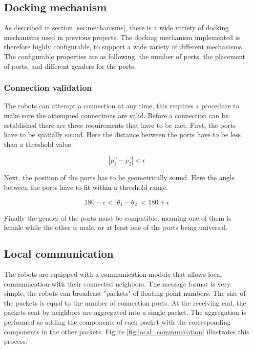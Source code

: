 	 
	\subsection{Docking mechanism}
	As described in section \ref{sec:mechanisms}, there is a wide variety of docking mechanisms used in previous projects.
	The docking mechanism implemented is therefore highly configurable, to support a wide variety of different mechanisms.
	The configurable properties are as following, the number of ports, the placement of ports, and different genders for the ports. 
	
	\subsubsection{Connection validation}
		The robots can attempt a connection at any time, this requires a procedure to make sure the attempted connections are valid.
		Before a connection can be established there are three requirements that have to be met.
		First, the ports have to be spatially sound. 
		Here the distance between the ports have to be less than a threshold value.
		
		\begin{equation}
		|\vec{p_1} - \vec{p_2}| < \epsilon
		\end{equation}
		
		Next, the position of the ports has to be geometrically sound.
		Here the angle between the ports have to fit within a threshold range.
		
		\begin{equation}
		 180 - \epsilon < |\theta_1 - \theta_2| < 180 + \epsilon
		\end{equation}
		
		Finally the gender of the ports must be compatible, meaning one of them is female while the other is male, or at least one of the ports being universal.
		
	\subsection{Local communication}
	The robots are equipped with a communication module that allows local communication with their connected neighbors.
	The message format is very simple, the robots can broadcast "packets" of floating point numbers.
	The size of the packets is equal to the number of connection ports.
	At the receiving end, the packets sent by neighbors are aggregated into a single packet.
	The aggregation is performed as adding the components of each packet with the corresponding components in the other packets. Figure \ref{fig:local_communication} illustrates this process.
	
